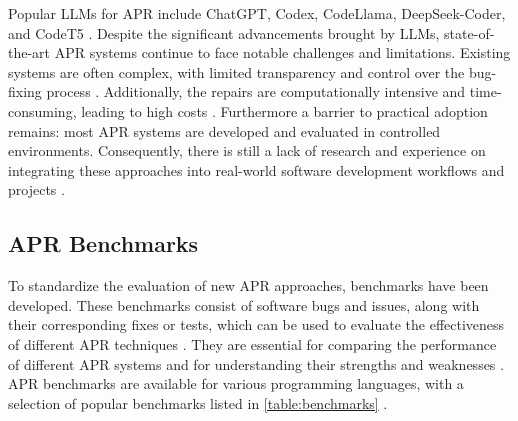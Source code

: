 Popular \acp{LLM} for APR include ChatGPT, Codex, CodeLlama, DeepSeek-Coder, and CodeT5 \cite{houLargeLanguageModels2024, yinThinkRepairSelfDirectedAutomated2024, anandComprehensiveSurveyAIDriven2024}. Despite the significant advancements brought by \acp{LLM}, state-of-the-art APR systems continue to face notable challenges and limitations. Existing systems are often complex, with limited transparency and control over the bug-fixing process \cite{xiaAgentlessDemystifyingLLMbased2024, puvvadiCodingAgentsComprehensive2025, houLargeLanguageModels2024}. Additionally, the repairs are computationally intensive and time-consuming, leading to high costs \cite{sobaniaAnalysisAutomaticBug2023, puvvadiCodingAgentsComprehensive2025}.
Furthermore a barrier to practical adoption remains: most APR systems are developed and evaluated in controlled environments. Consequently, there is still a lack of research and experience on integrating these approaches into real-world software development workflows and projects \cite{meemExploringExperiencesAutomated2024, puvvadiCodingAgentsComprehensive2025}.


\subsection{APR Benchmarks}

To standardize the evaluation of new APR approaches, benchmarks have been developed. These benchmarks consist of software bugs and issues, along with their corresponding fixes or tests, which can be used to evaluate the effectiveness of different APR techniques \cite{anandComprehensiveSurveyAIDriven2024}. They are essential for comparing the performance of different APR systems and for understanding their strengths and weaknesses \cite{puvvadiCodingAgentsComprehensive2025}. APR benchmarks are available for various programming languages, with a selection of popular benchmarks listed in \ref{table:benchmarks} \cite{wangSoftwareDevelopmentLife2025}.

